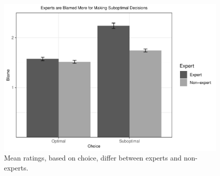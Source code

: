 \documentclass[
  man, donotrepeattitle,floatsintext]{apa6}
\begin{document}
\begin{figure}
\centering
\includegraphics{ScientificReportManuscript_FINAL_files/figure-latex/fig-plot-1-1.pdf}
\caption{\label{fig:fig-plot-1}Mean ratings, based on choice, differ between experts and non-experts.}
\end{figure}
\end{document}
